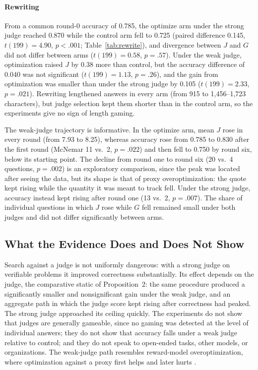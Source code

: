 \documentclass[acmsmall,screen,review,anonymous]{acmart}
\theoremstyle{acmdefinition}
\begin{document}
\paragraph{Rewriting} From a common round-0 accuracy of 0.785, the optimize arm under the strong judge reached 0.870 while the control arm fell to 0.725 (paired difference 0.145, $t(199) = 4.90$, $p < .001$; Table~\ref{tab:rewrite}), and divergence between $J$ and $G$ did not differ between arms ($t(199) = 0.58$, $p = .57$). Under the weak judge, optimization raised $J$ by 0.38 more than control, but the accuracy difference of 0.040 was not significant ($t(199) = 1.13$, $p = .26$), and the gain from optimization was smaller than under the strong judge by 0.105 ($t(199) = 2.33$, $p = .021$). Rewriting lengthened answers in every arm (from 915 to 1,456--1,723 characters), but judge selection kept them shorter than in the control arm, so the experiments give no sign of length gaming.

The weak-judge trajectory is informative. In the optimize arm, mean $J$ rose in every round (from 7.93 to 8.25), whereas accuracy rose from 0.785 to 0.830 after the first round (McNemar 11 vs.\ 2, $p = .022$) and then fell to 0.750 by round six, below its starting point. The decline from round one to round six (20 vs.\ 4 questions, $p = .002$) is an exploratory comparison, since the peak was located after seeing the data, but its shape is that of proxy overoptimization: the quote kept rising while the quantity it was meant to track fell. Under the strong judge, accuracy instead kept rising after round one (13 vs.\ 2, $p = .007$). The share of individual questions in which $J$ rose while $G$ fell remained small under both judges and did not differ significantly between arms.

\subsection{What the Evidence Does and Does Not Show}

Search against a judge is not uniformly dangerous: with a strong judge on verifiable problems it improved correctness substantially. Its effect depends on the judge, the comparative static of Proposition~2: the same procedure produced a significantly smaller and nonsignificant gain under the weak judge, and an aggregate path in which the judge score kept rising after correctness had peaked. The strong judge approached its ceiling quickly. The experiments do not show that judges are generally gameable, since no gaming was detected at the level of individual answers; they do not show that accuracy falls under a weak judge relative to control; and they do not speak to open-ended tasks, other models, or organizations. The weak-judge path resembles reward-model overoptimization, where optimization against a proxy first helps and later hurts \citep{gao2023}.
\end{document}

